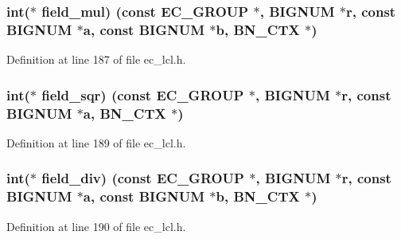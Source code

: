 \subsubsection[{\texorpdfstring{field\+\_\+mul}{field_mul}}]{\setlength{\rightskip}{0pt plus 5cm}int($\ast$ field\+\_\+mul) (const {\bf E\+C\+\_\+\+G\+R\+O\+UP} $\ast$, {\bf B\+I\+G\+N\+UM} $\ast$r, const {\bf B\+I\+G\+N\+UM} $\ast${\bf a}, const {\bf B\+I\+G\+N\+UM} $\ast$b, {\bf B\+N\+\_\+\+C\+TX} $\ast$)}\hypertarget{structec__method__st_a3812e1059e780a47c679cc14a73b88f9}{}\label{structec__method__st_a3812e1059e780a47c679cc14a73b88f9}


Definition at line 187 of file ec\+\_\+lcl.\+h.

\subsubsection[{\texorpdfstring{field\+\_\+sqr}{field_sqr}}]{\setlength{\rightskip}{0pt plus 5cm}int($\ast$ field\+\_\+sqr) (const {\bf E\+C\+\_\+\+G\+R\+O\+UP} $\ast$, {\bf B\+I\+G\+N\+UM} $\ast$r, const {\bf B\+I\+G\+N\+UM} $\ast${\bf a}, {\bf B\+N\+\_\+\+C\+TX} $\ast$)}\hypertarget{structec__method__st_a07ee2147be69a991d1be9bca41149403}{}\label{structec__method__st_a07ee2147be69a991d1be9bca41149403}


Definition at line 189 of file ec\+\_\+lcl.\+h.

\subsubsection[{\texorpdfstring{field\+\_\+div}{field_div}}]{\setlength{\rightskip}{0pt plus 5cm}int($\ast$ field\+\_\+div) (const {\bf E\+C\+\_\+\+G\+R\+O\+UP} $\ast$, {\bf B\+I\+G\+N\+UM} $\ast$r, const {\bf B\+I\+G\+N\+UM} $\ast${\bf a}, const {\bf B\+I\+G\+N\+UM} $\ast$b, {\bf B\+N\+\_\+\+C\+TX} $\ast$)}\hypertarget{structec__method__st_a421511b116422fcc0141889cb80f9d8c}{}\label{structec__method__st_a421511b116422fcc0141889cb80f9d8c}


Definition at line 190 of file ec\+\_\+lcl.\+h.


